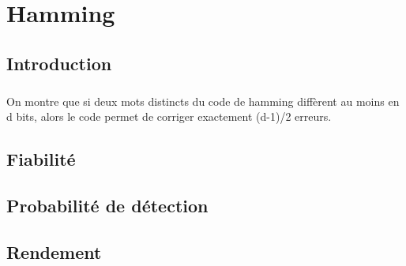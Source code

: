 
\chapter{Hamming}

    \section{Introduction}

        \paragraph{}
On montre que si deux mots distincts du code de hamming diffèrent au moins en d bits,
alors le code permet de corriger exactement (d-1)/2 erreurs.


    \section{Fiabilité}

        \paragraph{}


    \section{Probabilité de détection}

        \paragraph{}


    \section{Rendement}

        \paragraph{}
